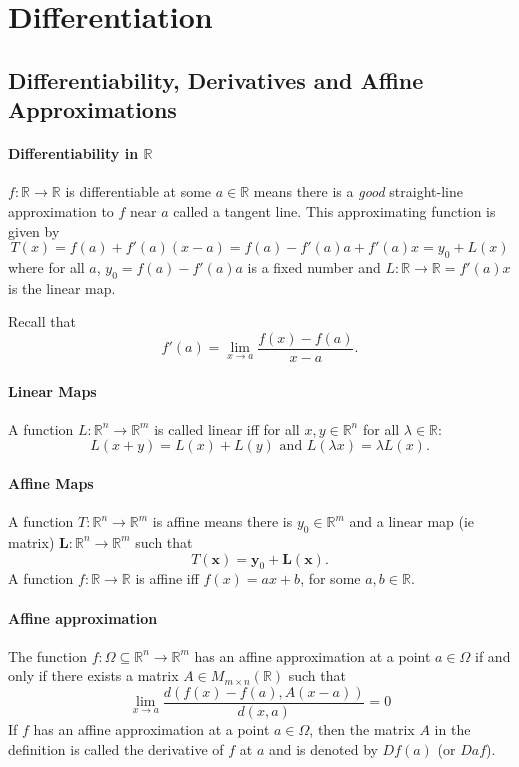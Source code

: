 
\section{Differentiation}

\subsection{Differentiability, Derivatives and Affine Approximations}

\paragraph{Differentiability in \(\mathbb{R}\)}
\(f: \mathbb{R}\to \mathbb{R}\) is differentiable at some \(a\in \mathbb{R}\)
means there is a \textit{good} straight-line approximation to \(f\) near \(a\) called a
tangent line.
This approximating function is given by
\[T(x) = f(a) + f'(a)(x-a) = f(a) -f'(a)a + f'(a)x = y_0 + L(x)\]
where for all \(a\), \(y_0 = f(a) - f'(a)a\) is a fixed number
and \(L: \mathbb{R}\to \mathbb{R} = f'(a)x\) is the linear map.

Recall that \[f'(a) = \lim_{x\to a} \frac{f(x) - f(a)}{x-a}.\]

\paragraph{Linear Maps} A function \(L: \mathbb{R}^n \to \mathbb{R}^m\) is called
linear iff for all \(x,y \in \mathbb{R}^n\) for all \(\lambda\in\mathbb{R}:\)
\[L(x+y) = L(x) + L(y) \text{  and  } L(\lambda x) = \lambda L(x).\]

\paragraph{Affine Maps} A function \(T: \mathbb{R}^n \to \mathbb{R}^m\) is affine
means there is \(y_0 \in \mathbb{R}^m\) and a linear map (ie matrix) 
\(\textbf{L}: \mathbb{R}^n \to \mathbb{R}^m\) such that 
\[T(\textbf{x}) = \textbf{y}_0 + \textbf{L}(\textbf{x}).\]
A function \(f: \mathbb{R} \to \mathbb{R}\) is affine iff \(f(x) = ax + b\), for some
\(a, b \in \mathbb{R}\).

\paragraph{Affine approximation}
The function \(f: \Omega \subseteq \mathbb{R}^n \to \mathbb{R}^m\) has an affine
approximation at a point \(a \in \Omega\) if and only if there exists a matrix
\(A \in M_{m\times n} (\mathbb{R})\) such that 
\[\lim_{x\to a} \frac{d(f(x) - f(a), A(x-a))}{d(x, a)} = 0\]
If \(f\) has an affine approximation at a point \(a \in \Omega\), then the matrix \(A\)
in the definition is called the derivative of \(f\) at \(a\) and is denoted by \(Df(a)\)
(or \(Daf\)).

